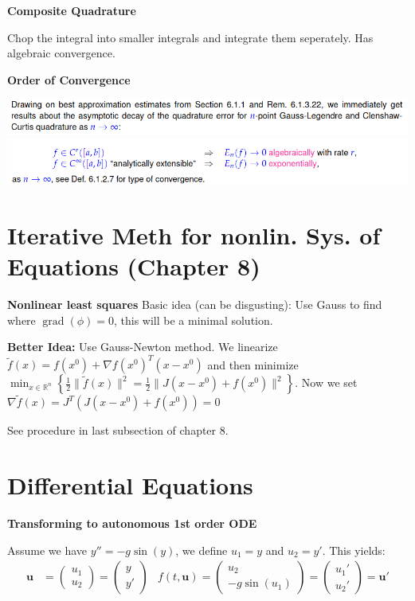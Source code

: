 \documentclass{sciposter}
\renewcommand{\vec}[1]{\mathbf{#1}}
\newcommand{\psection}[1]{\par \textbf{\large#1}}
\begin{document}
\begin{multicols}{2}
\psection{Composite Quadrature}

Chop the integral into smaller integrals and integrate them seperately. Has algebraic convergence.


\psection{Order of Convergence}

\includegraphics[width=\linewidth]{img/o1.png}
\includegraphics[width=\linewidth]{img/o2.png}


\section*{Iterative Meth for nonlin. Sys. of Equations (Chapter 8)}


\psection{Nonlinear least squares}
{
\color{red} Basic idea (can be disgusting): Use Gauss to find where $\operatorname{grad}(\phi) = 0$, this will be a minimal solution.
}

\textbf{Better Idea:} Use Gauss-Newton method. We linearize ${\displaystyle {\tilde {f}}(x)=f(x^{0})+\nabla f(x^{0})^{T}(x-x^{0})}$ and then minimize ${\displaystyle \min _{x\in \mathbb {R} ^{n}}\left\{{\frac {1}{2}}\|{\tilde {f}}(x)\|^{2}={\frac {1}{2}}\|J(x-x^{0})+f(x^{0})\|^{2}\right\}}$. Now we set ${\displaystyle \nabla {\tilde {f}}(x)=J^{T}\left(J(x-x^{0})+f(x^{0})\right)} = 0$

See procedure in last subsection of chapter 8.


\section*{Differential Equations}

\psection{Transforming to autonomous 1st order ODE}

Assume we have $y'' = -g\sin(y)$, we define $u_1 = y$ and $u_2 = y'$. This yields:
\begin{align*}
	\vec{u} &= \begin{pmatrix}
	u_1 \\ u_2
	\end{pmatrix} = \begin{pmatrix}
	y \\ y'
	\end{pmatrix} & f(t,\vec{u}) = \begin{pmatrix}
	u_2 \\ -g\sin(u_1)
	\end{pmatrix} = \begin{pmatrix}
	u_1 '\\ u_2 '
	\end{pmatrix} = \vec{u}'
\end{align*}



\end{multicols}
\end{document}
